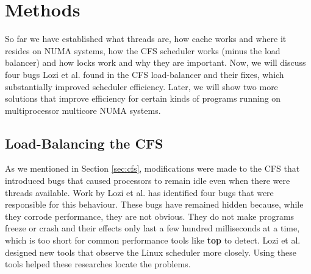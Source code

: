 \documentclass{sig-alternate}
\begin{document}

\section{Methods}
\label{sec:methods}

So far we have established what threads are, how cache works and where it resides on NUMA systems, how the CFS scheduler works (minus the load balancer) and how locks work and why they are important. Now, we will discuss four bugs Lozi et al. found in the CFS load-balancer and their fixes, which substantially improved scheduler efficiency. Later, we will show two more solutions that improve efficiency for certain kinds of programs running on multiprocessor multicore NUMA systems.

\subsection{Load-Balancing the CFS}
\label{sec:loadbalance}

As we mentioned in Section \ref{sec:cfs}, modifications were made to the CFS that introduced bugs that caused processors to remain idle even when there were threads available. Work by Lozi et al. has identified four bugs that were responsible for this behaviour. These bugs have remained hidden because, while they corrode performance, they are not obvious. They do not make programs freeze or crash and their effects only last a few hundred milliseconds at a time, which is too short for common performance tools like \textbf{top} to detect. Lozi et al. designed new tools that observe the Linux scheduler more closely. Using these tools helped these researches locate the problems.~\cite{Lozi:2016}
\end{document}
